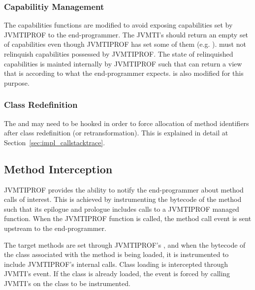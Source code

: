 \subsubsection*{Capabilitiy Management}

The capabilities functions are modified to avoid exposing capabilities set by JVMTIPROF to the end-programmer. The JVMTI's  should return an empty set of capabilities even though JVMTIPROF has set some of them (e.g. ).  must not relinquish capabilities possessed by JVMTIPROF. The state of relinquished capabilities is mainted internally by JVMTIPROF such that  can return a view that is according to what the end-programmer expects.  is also modified for this purpose.


\subsubsection*{Class Redefinition}

The  and  may need to be hooked in order to force allocation of method identifiers after class redefinition (or retransformation). This is explained in detail at Section~\ref{sec:impl_callstacktrace}.

\subsection{Method Interception}

JVMTIPROF provides the ability to notify the end-programmer about method calls of interest. This is achieved by instrumenting the bytecode of the method such that its epilogue and prologue includes calls to a JVMTIPROF managed function. When the JVMTIPROF function is called, the method call event is sent upstream to the end-programmer.

The target methods are set through JVMTIPROF's , and when the bytecode of the class associated with the method is being loaded, it is instrumented to include JVMTIPROF's internal calls. Class loading is intercepted through JVMTI's   event. If the class is already loaded, the event is forced by calling JVMTI's  on the class to be instrumented.

